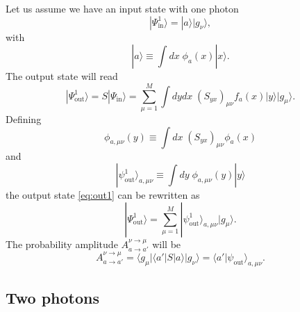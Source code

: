 \documentclass[aps,pra,reprint,amsmath,amssymb]{revtex4-1}
\begin{document}
Let us assume we have an input state with one photon
\begin{equation}
|\Psi_\text{in}^1\rangle=|a\rangle|g_\nu\rangle,
\end{equation}
with
\begin{equation}
|a\rangle\equiv \int dx\; \phi_a(x)|x\rangle.
\end{equation}
The output state will read
\begin{equation}\label{eq:out1}
|\Psi_\text{out}^1\rangle = S|\Psi_\text{in}\rangle = \sum_{\mu=1}^M \int dy dx\;(S_{yx})_{\mu\nu}f_a(x)|y\rangle|g_\mu\rangle.
\end{equation}
Defining
\begin{equation}\label{eq:phi_munu}
\phi_{a,\mu\nu}(y)\equiv \int dx\; (S_{yx})_{\mu\nu} \phi_a(x)
\end{equation}
and
\begin{equation}\label{eq:out_munu}
|\psi_\text{out}^1\rangle_{a,\mu\nu}\equiv \int dy\;\phi_{a,\mu\nu}(y) |y\rangle
\end{equation}
the output state \eqref{eq:out1} can be rewritten as
\begin{equation}
|\Psi_\text{out}^1\rangle = \sum_{\mu=1}^M |\psi_\text{out}^1\rangle_{a,\mu\nu}|g_\mu\rangle.
\end{equation}
The probability amplitude $A_{a\to a'}^{\nu\to\mu}$ will be
\begin{equation}\label{eq:A1}
A_{a\to a'}^{\nu\to\mu} = \langle g_\mu|\langle a'|S|a\rangle|g_\nu\rangle = \langle a'|\psi_\text{out}\rangle_{a,\mu\nu}.
\end{equation}

\subsection{Two photons}
\end{document}
